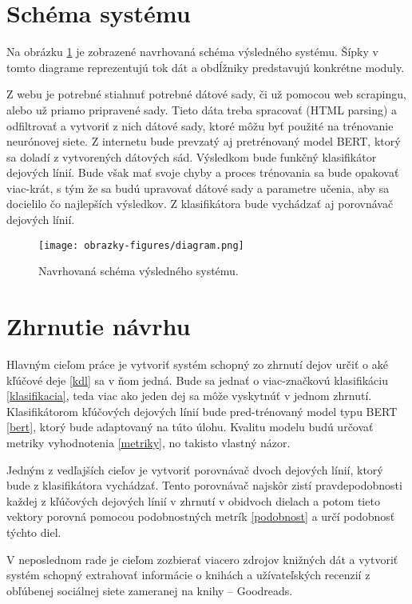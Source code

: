 \section{Schéma systému}

Na obrázku \ref{schema} je zobrazené navrhovaná schéma výsledného systému. Šípky v tomto diagrame reprezentujú tok dát a obdĺžniky predstavujú konkrétne moduly.

Z webu je potrebné stiahnuť potrebné dátové sady, či už pomocou web scrapingu, alebo už priamo pripravené sady. Tieto dáta treba spracovať (HTML parsing) a odfiltrovať a vytvoriť z nich dátové sady, ktoré môžu byť použité na trénovanie neurónovej siete. Z internetu bude prevzatý aj pretrénovaný model BERT, ktorý sa doladí z vytvorených dátových sád. Výsledkom bude funkčný klasifikátor dejových línií. Bude však mať svoje chyby a proces trénovania sa bude opakovať viac-krát, s tým že sa budú upravovať dátové sady a parametre učenia, aby sa docielilo čo najlepších výsledkov. Z klasifikátora bude vychádzať aj porovnávač dejových línií.

\begin{figure}[ht!]
	\centering
	\texttt{[image: obrazky-figures/diagram.png]}
	\caption{Navrhovaná schéma výsledného systému.}
	\label{schema}
\end{figure}

\section{Zhrnutie návrhu}

Hlavným cieľom práce je vytvoriť systém schopný zo zhrnutí dejov určiť o aké kľúčové deje \ref{kdl} sa v ňom jedná. Bude sa jednať o viac-značkovú klasifikáciu \ref{klasifikacia}, teda viac ako jeden dej sa môže vyskytnúť v jednom zhrnutí. Klasifikátorom kľúčových dejových línií bude pred-trénovaný model typu BERT \ref{bert}, ktorý bude adaptovaný na túto úlohu. Kvalitu modelu budú určovať metriky vyhodnotenia \ref{metriky}, no takisto vlastný názor.

Jedným z vedľajších cieľov je vytvoriť porovnávač dvoch dejových línií, ktorý bude z klasifikátora vychádzať. Tento porovnávač najskôr zistí pravdepodobnosti každej z kľúčových dejových línií v zhrnutí  v obidvoch dielach a potom tieto vektory porovná pomocou podobnostných metrík \ref{podobnost} a určí podobnosť týchto diel.

V neposlednom rade je cieľom zozbierať viacero zdrojov knižných dát a vytvoriť systém schopný extrahovať informácie o knihách a užívateľských recenzií z obľúbenej sociálnej siete zameranej na knihy -- Goodreads.

